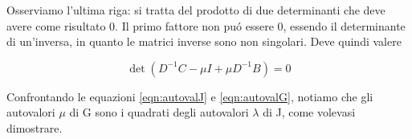 \begin{thproof}
Osserviamo l'ultima riga: si tratta del prodotto di due determinanti che deve avere come risultato 0. Il primo fattore non pu\'o essere 0, essendo il determinante di un'inversa, in quanto le matrici inverse sono non singolari. Deve quindi valere

\begin{equation}\label{eqn:autovalG}
\det \left( D^{-1}C - \mu I + \mu D^{-1} B \right) = 0
\end{equation}

Confrontando le equazioni \ref{eqn:autovalJ} e \ref{eqn:autovalG}, notiamo che gli autovalori $ \mu $ di G sono i quadrati degli autovalori $ \lambda $ di J, come volevasi dimostrare.
\end{thproof}

\outbpdocument
